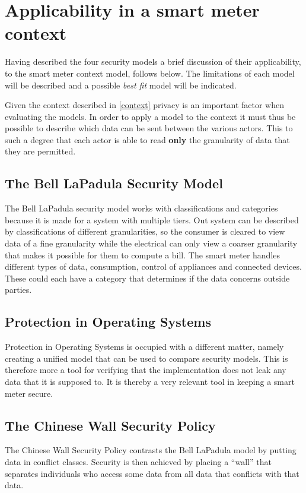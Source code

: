 \section{Applicability in a smart meter context}
Having described the four security models a brief discussion of their applicability, to the smart meter context model, follows below.
The limitations of each model will be described and a possible \emph{best fit} model will be indicated.

Given the context described in \cref{context} privacy is an important factor when evaluating the models.
In order to apply a model to the context it must thus be possible to describe which data can be sent between the various actors.
This to such a degree that each actor is able to read \textbf{only} the granularity of data that they are permitted.

\subsection{The Bell LaPadula Security Model}
The Bell LaPadula security model works with classifications and categories because it is made for a system with multiple tiers.
Out system can be described by classifications of different granularities, so the consumer is cleared to view data of a fine granularity while the electrical can only view a coarser granularity that makes it possible for them to compute a bill.
The smart meter handles different types of data, consumption, control of appliances and connected devices.
These could each have a category that determines if the data concerns outside parties.

\subsection{Protection in Operating Systems}
Protection in Operating Systems is occupied with a different matter, namely creating a unified model that can be used to compare security models.
This is therefore more a tool for verifying that the implementation does not leak any data that it is supposed to.
It is thereby a very relevant tool in keeping a smart meter secure.

\subsection{The Chinese Wall Security Policy}
The Chinese Wall Security Policy contrasts the Bell LaPadula model by putting data in conflict classes.
Security is then achieved by placing a ``wall'' that separates individuals who access some data from all data that conflicts with that data.

